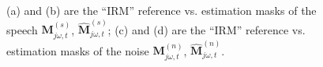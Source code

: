 \begin{figure}[H]
    \centering
    \hspace{0.1cm}
    \vspace{-0.35cm}
    \hspace{0.1cm}
        \caption{(a) and (b) are the ``IRM'' 
        reference vs. estimation masks of the speech
        \(\mathbf{M}^{(s)}_{j\omega, t}\), \(\mathbf{\widehat{M}}^{(s)}_{j\omega, t}\);\;\;
        (c) and (d) are the ``IRM'' reference vs. estimation masks 
        of the noise \(\mathbf{M}^{(n)}_{j\omega, t}\), \(\mathbf{\widehat{M}}^{(n)}_{j\omega, t}\).}\label{fig:irm_ref_s_n} 
\end{figure}


